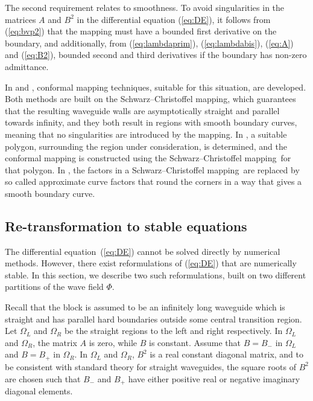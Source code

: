 \documentclass[numreferences]{kluwer}
\renewcommand{\Phi}{\varPhi}
\renewcommand{\vec}[1]{\bm{#1}}
\newcommand{\scm}{Schwarz--Chris\-tof\-fel mapping}
\renewcommand{\Phi}{\varPhi}
\begin{document}
The second requirement relates to smoothness. To avoid singularities
in the matrices $A$ and $B^2$ in the differential equation
(\ref{eq:DE}), it follows from (\ref{eq:bvp2}) that the mapping must
have a bounded first derivative on the boundary, and additionally,
from (\ref{eq:lambdaprim}), (\ref{eq:lambdabis}), (\ref{eq:A}) and
(\ref{eq:B2}), bounded second and third derivatives if the boundary
has non-zero admittance.

In \cite{andersson-outpol:2008} and \cite{andersson-acf:2009},
conformal mapping techniques, suitable for this situation, are
developed. Both methods are built on the \scm, which guarantees that
the resulting waveguide walls are asymptotically straight and parallel
towards infinity, and they both result in regions with smooth boundary
curves, meaning that no singularities are introduced by the
mapping. In \cite{andersson-outpol:2008}, a suitable polygon,
surrounding the region under consideration, is determined, and the
conformal mapping is constructed using the \scm\ for that
polygon. In \cite{andersson-acf:2009}, the factors in a \scm\ are
replaced by so called approximate curve factors that round the corners
in a way that gives a smooth boundary curve.

\subsection{Re-transformation to stable equations}
\label{sec:stableeq}
The differential equation~(\ref{eq:DE}) cannot be solved directly by
numerical methods. However, there exist reformulations of
(\ref{eq:DE}) that are numerically stable.
In this section, we describe two such reformulations, built on two
different partitions of the wave field $\vec\Phi$.

Recall that the block is assumed to be an infinitely long waveguide
which is straight and has parallel hard boundaries outside some
central transition region. Let $\Omega_L$ and $\Omega_R$ be the
straight regions to the left and right respectively.  In $\Omega_L$
and $\Omega_R$, the matrix $A$ is zero, while $B$ is constant. Assume
that $B=B_-$ in $\Omega_L$ and $B=B_+$ in $\Omega_R$. In $\Omega_L$
and $\Omega_R$, $B^2$ is a real constant diagonal matrix, and to be
consistent with standard theory for straight waveguides, the square
roots of $B^2$ are chosen such that $B_-$ and $B_+$ have either
positive real or negative imaginary diagonal elements.
\end{document}
